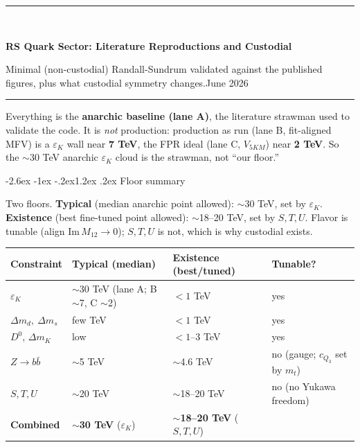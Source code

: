 \documentclass[11pt]{article}
\makeatletter
\renewcommand\section{\@startsection{section}{1}{\z@}%
  {-2.6ex \@plus -1ex \@minus -.2ex}{1.2ex \@plus.2ex}%
  {\normalfont\Large\bfseries\color{accent}}}
\newcommand{\blurb}[1]{{\small #1}\par}
\makeatother
\begin{document}
\begin{center}
{\color{accent}\rule{\textwidth}{1.4pt}}\\[0.6em]
{\LARGE\bfseries RS Quark Sector: Literature Reproductions and Custodial\par}
\vspace{0.3em}
{\large Minimal (non-custodial) Randall-Sundrum validated against the published
figures, plus what custodial symmetry changes.\quad June 2026\par}
\vspace{0.2em}
{\color{accent}\rule{\textwidth}{1.4pt}}
\end{center}

\blurb{Everything is the \textbf{anarchic baseline (lane A)}, the literature strawman
used to validate the code. It is \emph{not} production: production as run (lane B,
fit-aligned MFV) is a $\varepsilon_K$ wall near \textbf{7 TeV}, the FPR ideal
(lane C, $V_{5KM}$) near \textbf{2 TeV}. So the $\sim$30 TeV anarchic
$\varepsilon_K$ cloud is the strawman, not ``our floor.''}

\section{Floor summary}

\blurb{Two floors. \textbf{Typical} (median anarchic point allowed):
$\sim$30 TeV, set by $\varepsilon_K$. \textbf{Existence} (best fine-tuned point
allowed): $\sim$18--20 TeV, set by $S,T,U$. Flavor is tunable (align
$\mathrm{Im}\,M_{12}\to0$); $S,T,U$ is not, which is why custodial exists.}

\begin{center}
\small
\begin{tabular}{@{}llll@{}}
\toprule
Constraint & Typical (median) & Existence (best/tuned) & Tunable? \\
\midrule
$\varepsilon_K$       & $\sim$30 TeV (lane A; B $\sim$7, C $\sim$2) & $<\!1$ TeV & yes \\
$\Delta m_d,\ \Delta m_s$ & few TeV & $<\!1$ TeV & yes \\
$D^0$, $\Delta m_K$   & low      & $<\!1$--3 TeV & yes \\
$Z\to b\bar b$        & $\sim$5 TeV & $\sim$4.6 TeV & no (gauge; $c_{Q_3}$ set by $m_t$) \\
$S,T,U$               & $\sim$20 TeV & $\sim$18--20 TeV & no (no Yukawa freedom) \\
\midrule
\textbf{Combined}     & \textbf{$\sim$30 TeV} ($\varepsilon_K$) & \textbf{$\sim$18--20 TeV} ($S,T,U$) & \\
\bottomrule
\end{tabular}
\end{center}
\end{document}
